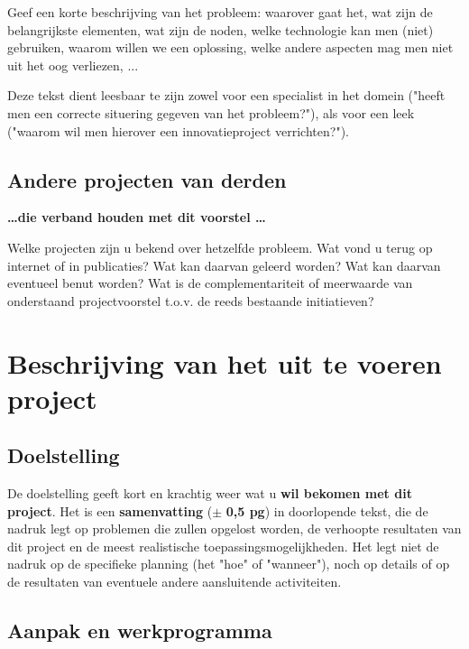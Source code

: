 \documentclass[10pt]{article}
\begin{document}
Geef een korte beschrijving van het probleem: waarover gaat het, wat zijn de belangrijkste elementen, wat zijn de noden, welke technologie kan men (niet) gebruiken, waarom willen we een oplossing, welke andere aspecten mag men niet uit het oog verliezen, ...

Deze tekst dient leesbaar te zijn zowel voor een specialist in het domein ("heeft men een correcte situering gegeven van het probleem?"), als voor een leek ("waarom wil men hierover een innovatieproject verrichten?").




\subsection{Andere projecten van derden}\label{sec:Andere}
\textbf{\ldots die verband houden met dit voorstel \ldots }

Welke projecten zijn u bekend over hetzelfde probleem. Wat vond u terug op internet of in publicaties? Wat kan daarvan geleerd worden? Wat kan daarvan eventueel benut worden? Wat is de complementariteit of meerwaarde van onderstaand projectvoorstel t.o.v. de reeds bestaande initiatieven?


\section{Beschrijving van het uit te voeren project}\label{sec:Beschrijving}

\subsection{Doelstelling}\label{sec:Doelstelling}
De doelstelling geeft kort en krachtig weer wat u \textbf{wil bekomen met dit project}. Het is een \textbf{samenvatting} ($\pm$ \textbf{0,5 pg}) in doorlopende tekst, die de nadruk legt op problemen die zullen opgelost worden, de verhoopte resultaten van dit project en de meest realistische toepassingsmogelijkheden. Het legt niet de nadruk op de specifieke planning (het "hoe" of "wanneer"), noch op details of op de resultaten van eventuele andere aansluitende activiteiten. 


\subsection{Aanpak en werkprogramma}\label{sec:Aanpak}
\end{document}
